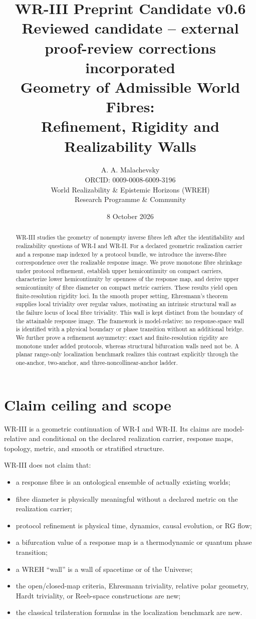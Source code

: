 \documentclass[11pt]{article}
\title{\textbf{WR-III Preprint Candidate v0.6}\\[2pt]
\normalsize Reviewed candidate -- external proof-review corrections incorporated\\[6pt]
\large Geometry of Admissible World Fibres:\\
Refinement, Rigidity and Realizability Walls}
\author{A. A. Malachevsky\\
ORCID: 0009-0008-6009-3196\\
World Realizability \& Epistemic Horizons (WREH)\\
Research Programme \& Community}
\date{8 October 2026}
\begin{document}
\maketitle

\begin{abstract}
WR-III studies the geometry of nonempty inverse fibres left after the
identifiability and realizability questions of WR-I and WR-II. For a declared
geometric realization carrier and a response map indexed by a protocol bundle,
we introduce the inverse-fibre correspondence over the realizable response
image. We prove monotone fibre shrinkage under protocol refinement, establish
upper hemicontinuity on compact carriers, characterize lower hemicontinuity by
openness of the response map, and derive upper semicontinuity of fibre diameter
on compact metric carriers. These results yield open finite-resolution
rigidity loci. In the smooth proper setting, Ehresmann's theorem supplies local
triviality over regular values, motivating an intrinsic structural wall as the
failure locus of local fibre triviality. This wall is kept distinct from the
boundary of the attainable response image. The framework is model-relative:
no response-space wall is identified with a physical boundary or phase
transition without an additional bridge. We further prove a refinement
asymmetry: exact and finite-resolution rigidity are monotone under added
protocols, whereas structural bifurcation walls need not be. A planar
range-only localization benchmark realizes this contrast explicitly through
the one-anchor, two-anchor, and three-noncollinear-anchor ladder.
\end{abstract}

\section{Claim ceiling and scope}

WR-III is a geometric continuation of WR-I and WR-II. Its claims are
model-relative and conditional on the declared realization carrier, response
maps, topology, metric, and smooth or stratified structure.

WR-III does not claim that:
\begin{itemize}
\item a response fibre is an ontological ensemble of actually existing worlds;
\item fibre diameter is physically meaningful without a declared metric on the realization carrier;
\item protocol refinement is physical time, dynamics, causal evolution, or RG flow;
\item a bifurcation value of a response map is a thermodynamic or quantum phase transition;
\item a WREH ``wall'' is a wall of spacetime or of the Universe;
\item the open/closed-map criteria, Ehresmann triviality, relative polar geometry, Hardt triviality, or Reeb-space constructions are new;
\item the classical trilateration formulas in the localization benchmark are new.
\end{itemize}
\end{document}
